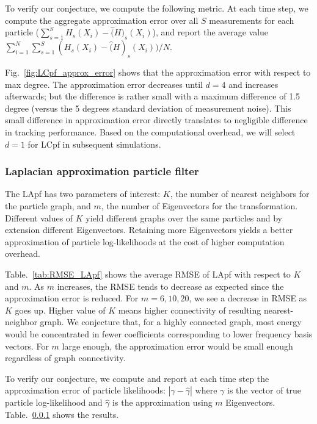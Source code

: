 \documentclass[10pt,letterpaper,final]{article}
\begin{document}
To verify our conjecture, we compute the following metric. At each time step, we compute the aggregate approximation error over all $S$ measurements for each particle ($\sum_{s=1}^S H_s(X_i)-\hat(H)_s(X_i)$), and report the average value $\sum_{i=1}^N \sum_{s=1}^S(H_s(X_i)-\hat(H)_s(X_i))/N$. 

Fig.~\ref{fig:LCpf_approx_error} shows that the approximation error with respect to max degree. The approximation error decreases until $d=4$ and increases afterwards; but the difference is rather small with a maximum difference of 1.5 degree (versus the 5 degrees standard deviation of measurement noise). This small difference in approximation error directly translates to negligible difference in tracking performance. Based on the computational overhead, we will select $d=1$ for LCpf in subsequent simulations. 



\subsubsection{Laplacian approximation particle filter}
The LApf has two parameters of interest: $K$, the number of nearest neighbors for the particle graph, and $m$, the number of Eigenvectors for the transformation. Different values of $K$ yield different graphs over the same particles and by extension different Eigenvectors. Retaining more Eigenvectors yields a better approximation of particle log-likelihoods at the cost of higher computation overhead. 

Table.~\ref{tab:RMSE_LApf} shows the average RMSE of LApf with respect to $K$ and $m$. As $m$ increases, the RMSE tends to decrease as expected since the approximation error is reduced.   For $m=6, 10, 20$, we see a decrease in RMSE as $K$ goes up.  Higher value of $K$ means higher connectivity of resulting nearest-neighbor graph. We conjecture that, for a highly connected graph, most energy would be concentrated in fewer coefficients corresponding to lower frequency basis vectors. For $m$ large enough, the approximation error would be small enough regardless of graph connectivity. 

To verify our conjecture, we compute and report at each time step the approximation error of particle likelihoods: $|\gamma-\hat{\gamma}|$ where $\gamma$ is the vector of true particle log-likelihood and $\hat{\gamma}$ is the approximation using $m$ Eigenvectors. Table.~\ref{} shows the results. 

\end{document}
